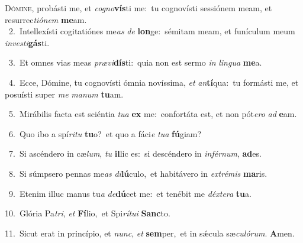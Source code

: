 \lettrine{\initial\textcolor{\initialcolor}{D}}{ómine,} probásti me, et \textit{co}\-\textit{gno}\textbf{vís}ti me:~\star tu cognovísti sessiónem meam, et resurrec\-\textit{ti}\-\textit{ó}\textit{nem} \textbf{me}\-am.\\
{\numbfont\textcolor{\numbcolor}{~2.}}~Intellexísti cogitatiónes me\textit{as} \textit{de} \textbf{lon}\-ge:~\star sémitam meam, et funículum meum \textit{in}\-\textit{ves}\textit{ti}\textbf{gás}ti.\par
{\numbfont\textcolor{\numbcolor}{~3.}}~Et omnes vias meas \textit{præ}\-\textit{vi}\textbf{dís}ti:~\star quia non est sermo \textit{in} \textit{lin}\-\textit{gua} \textbf{me}\-a.\par
{\numbfont\textcolor{\numbcolor}{~4.}}~Ecce, Dómine, tu cognovísti ómnia novíssima, \textit{et} \textit{an}\-\textbf{tí}qua:~\star tu formásti me, et posuísti super \textit{me} \textit{ma}\-\textit{num} \textbf{tu}\-am.\par
{\numbfont\textcolor{\numbcolor}{~5.}}~Mirábilis facta est sciéntia \textit{tu}\-\textit{a} \textbf{ex} me:~\star confortáta est, et non pót\-\textit{e}\-\textit{ro} \textit{ad} \textbf{e}\-am.\par
{\numbfont\textcolor{\numbcolor}{~6.}}~Quo ibo a spí\-\textit{ri}\-\textit{tu} \textbf{tu}\-o?~\star et quo a fáci\textit{e} \textit{tu}\-\textit{a} \textbf{fú}\-giam?\par
{\numbfont\textcolor{\numbcolor}{~7.}}~Si ascéndero in cæ\-\textit{lum}\-, \textit{tu} \textbf{il}\-lic es:~\star si descéndero in \textit{in}\-\textit{fér}\textit{num}, \textbf{ad}\-es.\par
{\numbfont\textcolor{\numbcolor}{~8.}}~Si súmpsero pennas me\textit{as} \textit{di}\-\textbf{lú}culo,~\star et habitávero in \textit{ex}\-\textit{tré}\textit{mis} \textbf{ma}\-ris.\par
{\numbfont\textcolor{\numbcolor}{~9.}}~Etenim illuc manus tu\textit{a} \textit{de}\-\textbf{dú}cet me:~\star et tenébit me \textit{déx}\-\textit{te}\textit{ra} \textbf{tu}\-a.\par
{\numbfont\textcolor{\numbcolor}{10.}}~Glória Pa\-\textit{tri}\-, \textit{et} \textbf{Fí}\-lio,~\star et Spi\-\textit{rí}\-\textit{tu}\textit{i} \textbf{Sanc}\-to.\par
{\numbfont\textcolor{\numbcolor}{11.}}~Sicut erat in princípio, et \textit{nunc}\-, \textit{et} \textbf{sem}\-per,~\star et in sǽcula sæ\-\textit{cu}\-\textit{ló}\textit{rum}. \textbf{A}\-men.\par
